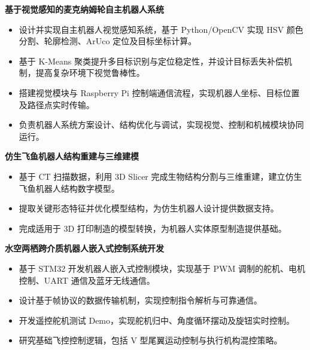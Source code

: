 \documentclass[10pt,a4paper]{article}
\begin{document}

\textbf{基于视觉感知的麦克纳姆轮自主机器人系统}

\begin{itemize}

\item
设计并实现自主机器人视觉感知系统，基于 Python/OpenCV 实现 HSV 颜色分割、轮廓检测、ArUco 定位及目标坐标计算。

\item
基于 K-Means 聚类提升多目标识别与定位稳定性，并设计目标丢失补偿机制，提高复杂环境下视觉鲁棒性。

\item
搭建视觉模块与 Raspberry Pi 控制端通信流程，实现机器人坐标、目标位置及路径点实时传输。

\item
负责机器人系统方案设计、结构优化与调试，实现视觉、控制和机械模块协同运行。

\end{itemize}




\textbf{仿生飞鱼机器人结构重建与三维建模}

\begin{itemize}

\item
基于 CT 扫描数据，利用 3D Slicer 完成生物结构分割与三维重建，建立仿生飞鱼机器人结构数字模型。

\item
提取关键形态特征并优化模型结构，为仿生机器人设计提供数据支持。

\item
完成适用于 3D 打印制造的模型转换，为机器人实体原型制造提供基础。

\end{itemize}


\textbf{水空两栖跨介质机器人嵌入式控制系统开发}

\begin{itemize}

\item
基于 STM32 开发机器人嵌入式控制模块，实现基于 PWM 调制的舵机、电机控制、UART 通信及蓝牙无线通信。

\item
设计基于帧协议的数据传输机制，实现控制指令解析与可靠通信。

\item
开发遥控舵机测试 Demo，实现舵机归中、角度循环摆动及旋钮实时控制。

\item
研究基础飞控控制逻辑，包括 V 型尾翼运动控制与执行机构混控策略。

\end{itemize}
\end{document}
